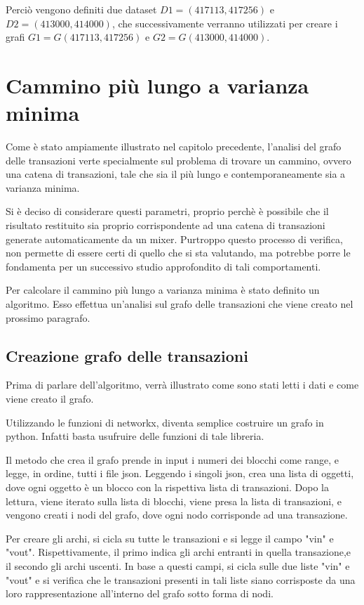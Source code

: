 Perciò vengono definiti due dataset $D1=(417113,417256)$ e $D2=(413000,414000)$, che successivamente verranno utilizzati per creare i grafi $G1=G(417113,417256)$ e $G2=G(413000,414000)$.

\section{Cammino più lungo a varianza minima}

Come è stato ampiamente illustrato nel capitolo precedente, l'analisi del grafo delle transazioni verte specialmente sul problema di trovare un cammino, ovvero una catena di transazioni, tale che sia il più lungo e contemporaneamente sia a varianza minima.

Si è deciso di considerare questi parametri, proprio perchè è possibile che il risultato restituito sia proprio corrispondente ad una catena di transazioni generate automaticamente da un mixer. Purtroppo questo processo di verifica, non permette di essere certi di quello che si sta valutando, ma potrebbe porre le fondamenta per un successivo studio approfondito di tali comportamenti.

Per calcolare il cammino più lungo a varianza minima è stato definito un algoritmo. Esso effettua un'analisi sul grafo delle transazioni che viene creato nel prossimo paragrafo.

\subsection{Creazione grafo delle transazioni}
Prima di parlare dell'algoritmo, verrà illustrato come sono stati letti i dati e come viene creato il grafo.

Utilizzando le funzioni di networkx, diventa semplice costruire un grafo in python. Infatti basta usufruire delle funzioni di tale libreria.

Il metodo che crea il grafo prende in input i numeri dei blocchi come range, e legge, in ordine, tutti i file json. Leggendo i singoli json, crea una lista di oggetti, dove ogni oggetto è un blocco con la rispettiva lista di transazioni. Dopo la lettura, viene iterato sulla lista di blocchi, viene presa la lista di transazioni, e vengono creati i nodi del grafo, dove ogni nodo corrisponde ad una transazione.

Per creare gli archi, si cicla su tutte le transazioni e si legge il campo "vin" e "vout". Rispettivamente, il primo indica gli archi entranti in quella transazione,e il secondo gli archi uscenti. In base a questi campi, si cicla sulle due liste "vin" e "vout" e si verifica che le transazioni presenti in tali liste siano corrisposte da una loro rappresentazione all'interno del grafo sotto forma di nodi. 

